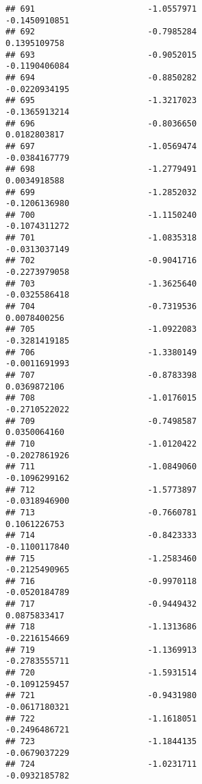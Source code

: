\documentclass[
]{article}
\begin{document}
\begin{verbatim}
## 691                       -1.0557971                         -0.1450910851
## 692                       -0.7985284                          0.1395109758
## 693                       -0.9052015                         -0.1190406084
## 694                       -0.8850282                         -0.0220934195
## 695                       -1.3217023                         -0.1365913214
## 696                       -0.8036650                          0.0182803817
## 697                       -1.0569474                         -0.0384167779
## 698                       -1.2779491                          0.0034918588
## 699                       -1.2852032                         -0.1206136980
## 700                       -1.1150240                         -0.1074311272
## 701                       -1.0835318                         -0.0313037149
## 702                       -0.9041716                         -0.2273979058
## 703                       -1.3625640                         -0.0325586418
## 704                       -0.7319536                          0.0078400256
## 705                       -1.0922083                         -0.3281419185
## 706                       -1.3380149                         -0.0011691993
## 707                       -0.8783398                          0.0369872106
## 708                       -1.0176015                         -0.2710522022
## 709                       -0.7498587                          0.0350064160
## 710                       -1.0120422                         -0.2027861926
## 711                       -1.0849060                         -0.1096299162
## 712                       -1.5773897                         -0.0318946900
## 713                       -0.7660781                          0.1061226753
## 714                       -0.8423333                         -0.1100117840
## 715                       -1.2583460                         -0.2125490965
## 716                       -0.9970118                         -0.0520184789
## 717                       -0.9449432                          0.0875833417
## 718                       -1.1313686                         -0.2216154669
## 719                       -1.1369913                         -0.2783555711
## 720                       -1.5931514                         -0.1091259457
## 721                       -0.9431980                         -0.0617180321
## 722                       -1.1618051                         -0.2496486721
## 723                       -1.1844135                         -0.0679037229
## 724                       -1.0231711                         -0.0932185782

\end{verbatim}
\end{document}
